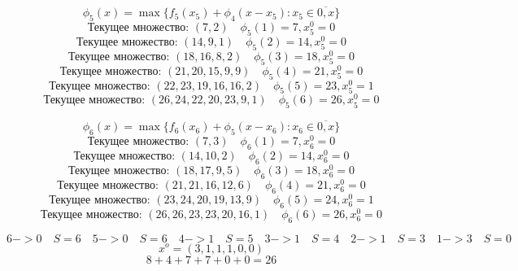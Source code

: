 \documentclass[17pt]{extarticle}
\begin{document}
\[\phi_5(x)=\max\{f_5(x_5) + \phi_4(x - x_5)\colon x_5\in \overline{0,x}\}\]
\[\text{Текущее множество: }(7, 2) \quad
    \phi_5(1)=7, x_5^0=0\]
\[\text{Текущее множество: }(14, 9, 1) \quad
    \phi_5(2)=14, x_5^0=0\]
\[\text{Текущее множество: }(18, 16, 8, 2) \quad
    \phi_5(3)=18, x_5^0=0\]
\[\text{Текущее множество: }(21, 20, 15, 9, 9) \quad
    \phi_5(4)=21, x_5^0=0\]
\[\text{Текущее множество: }(22, 23, 19, 16, 16, 2) \quad
    \phi_5(5)=23, x_5^0=1\]
\[\text{Текущее множество: }(26, 24, 22, 20, 23, 9, 1) \quad
    \phi_5(6)=26, x_5^0=0\]

\[\phi_6(x)=\max\{f_6(x_6) + \phi_5(x - x_6)\colon x_6\in \overline{0,x}\}\]
\[\text{Текущее множество: }(7, 3) \quad
    \phi_6(1)=7, x_6^0=0\]
\[\text{Текущее множество: }(14, 10, 2) \quad
    \phi_6(2)=14, x_6^0=0\]
\[\text{Текущее множество: }(18, 17, 9, 5) \quad
    \phi_6(3)=18, x_6^0=0\]
\[\text{Текущее множество: }(21, 21, 16, 12, 6) \quad
    \phi_6(4)=21, x_6^0=0\]
\[\text{Текущее множество: }(23, 24, 20, 19, 13, 9) \quad
    \phi_6(5)=24, x_6^0=1\]
\[\text{Текущее множество: }(26, 26, 23, 23, 20, 16, 1) \quad
    \phi_6(6)=26, x_6^0=0\]

\[
    6->0 \quad S=6 \quad 5->0 \quad S=6 \quad 4->1 \quad S=5 \quad 3->1 \quad S=4 \quad 2->1 \quad S=3 \quad 1->3 \quad S=0
\]
\[x^o=(3, 1, 1, 1, 0, 0)\]
\[8+4+7+7+0+0 = 26\]
\end{document}
